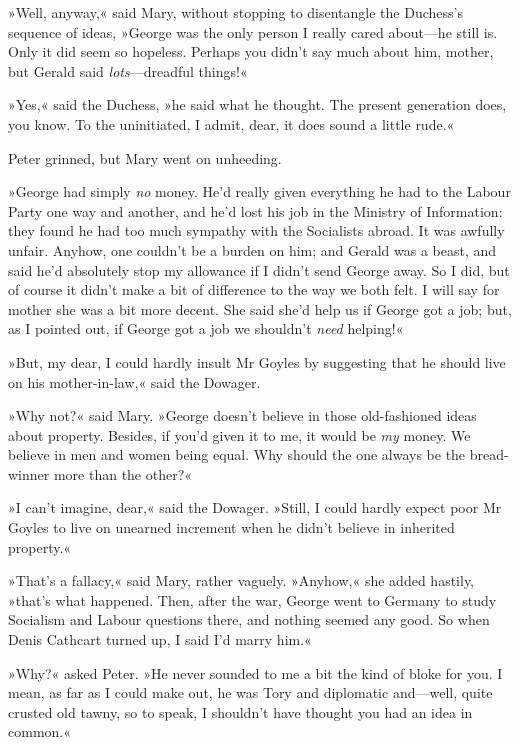 »Well, anyway,« said Mary, without stopping to disentangle the Duchess's sequence of ideas, »George was the only person I really cared about\allowbreak---\allowbreak he still is. Only it did seem so hopeless. Perhaps you didn't say much about him, mother, but Gerald said \textit{lots}---dreadful things!«

»Yes,« said the Duchess, »he said what he thought. The present generation does, you know. To the uninitiated, I admit, dear, it does sound a little rude.«

Peter grinned, but Mary went on unheeding.

»George had simply \textit{no} money. He'd really given everything he had to the Labour Party one way and another, and he'd lost his job in the Ministry of Information: they found he had too much sympathy with the Socialists abroad. It was awfully unfair. Anyhow, one couldn't be a burden on him; and Gerald was a beast, and said he'd absolutely stop my allowance if I didn't send George away. So I did, but of course it didn't make a bit of difference to the way we both felt. I will say for mother she was a bit more decent. She said she'd help us if George got a job; but, as I pointed out, if George got a job we shouldn't \textit{need} helping!«

»But, my dear, I could hardly insult Mr Goyles by suggesting that he should live on his mother-in-law,« said the Dowager.

»Why not?« said Mary. »George doesn't believe in those old-fashioned ideas about property. Besides, if you'd given it to me, it would be \textit{my} money. We believe in men and women being equal. Why should the one always be the bread-winner more than the other?«

»I can't imagine, dear,« said the Dowager. »Still, I could hardly expect poor Mr Goyles to live on unearned increment when he didn't believe in inherited property.«

»That's a fallacy,« said Mary, rather vaguely. »Anyhow,« she added hastily, »that's what happened. Then, after the war, George went to Germany to study Socialism and Labour questions there, and nothing seemed any good. So when Denis Cathcart turned up, I said I'd marry him.«

»Why?« asked Peter. »He never sounded to me a bit the kind of bloke for you. I mean, as far as I could make out, he was Tory and diplomatic and\allowbreak---\allowbreak well, quite crusted old tawny, so to speak, I shouldn't have thought you had an idea in common.«

